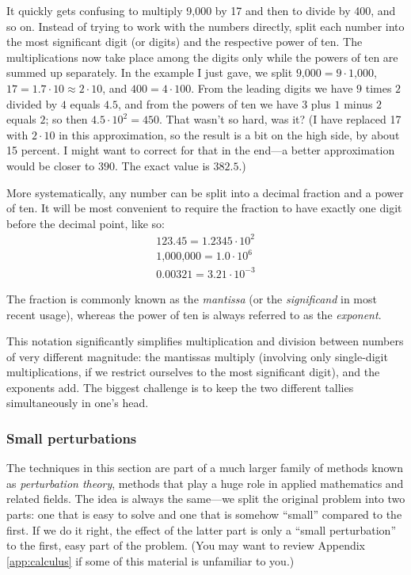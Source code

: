It quickly gets confusing to multiply 9,000 by 17 and then to divide
by 400, and so on. Instead of trying to work with the numbers
directly, split each number into the most significant digit (or
digits) and the respective power of ten. The multiplications now take
place among the digits only while the powers of ten are summed up
separately. In the example I just gave, we split $\text{9,000} = 9
\cdot \text{1,000}$, $17 = 1.7 \cdot 10 \approx 2 \cdot 10$, and $400
= 4 \cdot 100$.  From the leading digits we have $9$ times $2$ divided
by $4$ equals $4.5$, and from the powers of ten we have $3$ plus $1$
minus $2$ equals $2$; so then $4.5 \cdot 10^2 = 450$.  That wasn't so
hard, was it? (I have replaced 17 with $2 \cdot 10$ in this
approximation, so\vadjust{\pagebreak} the result is a bit on the high side, by about 15
percent. I might want to correct for that in the end---a better
approximation would be closer to $390$. The exact value is $382.5$.)
    
More systematically, any number can be split into a decimal fraction
and a power of ten. It will be most convenient to require the fraction
to have exactly one digit before the decimal point, like so:
\begin{gather*}
123.45 = 1.2345 \cdot 10^2 \\
\text{1,000,000} = 1.0 \cdot 10^6 \\
0.00321 = 3.21 \cdot 10^{-3}
\end{gather*}   
    
The fraction is commonly known as the \emph{mantissa} (or the
\emph{significand} in most recent usage), whereas the power of ten is
always referred to as the \emph{exponent}.
    
This notation significantly simplifies multiplication and division
between numbers of very different magnitude: the mantissas multiply
(involving only single-digit multiplications, if we restrict ourselves
to the most significant digit), and the exponents add. The biggest
challenge is to keep the two different tallies simultaneously in one's
head.

\subsubsection{Small perturbations}
    
    
The techniques in this section are part of a much larger family of
methods known as \emph{perturbation theory}, methods that play a huge
role in applied mathematics and related fields. The idea is always the
same---we split the original problem into two parts: one that is easy
to solve and one that is somehow ``small'' compared to the first. If
we do it right, the effect of the latter part is only a ``small
perturbation'' to the first, easy part of the problem. (You may want
to review Appendix \ref{app:calculus} if some of this material is
unfamiliar to you.)
    
